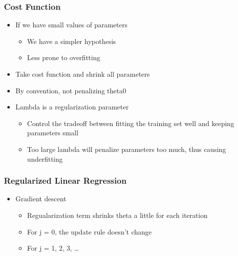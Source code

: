 \documentclass[]{article}
\providecommand{\tightlist}{%
  \setlength{\itemsep}{0pt}\setlength{\parskip}{0pt}}
\begin{document}
\hypertarget{cost-function-2}{%
\subsubsection{Cost Function}\label{cost-function-2}}

\begin{itemize}
\tightlist
\item
  If we have small values of parameters

  \begin{itemize}
  \tightlist
  \item
    We have a simpler hypothesis
  \item
    Less prone to overfitting
  \end{itemize}
\item
  Take cost function and shrink all parameters
\end{itemize}

\begin{itemize}
\tightlist
\item
  By convention, not penalizing theta0
\item
  Lambda is a regularization parameter

  \begin{itemize}
  \tightlist
  \item
    Control the tradeoff between fitting the training set well and
    keeping parameters small
  \item
    Too large lambda will penalize parameters too much, thus causing
    underfitting
  \end{itemize}
\end{itemize}

\hypertarget{regularized-linear-regression}{%
\subsubsection{Regularized Linear
Regression}\label{regularized-linear-regression}}

\begin{itemize}
\tightlist
\item
  Gradient descent

  \begin{itemize}
  \tightlist
  \item
    Regualarization term shrinks theta a little for each iteration
  \item
    For j = 0, the update rule doesn't change
  \item
    For j = 1, 2, 3, \ldots{}
  \end{itemize}
\end{itemize}
\end{document}
